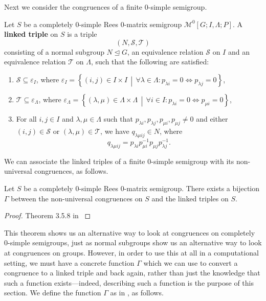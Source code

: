 Next we consider the congruences of a finite 0-simple semigroup.

\begin{definition}
  \label{def:linked-triple}
  Let $S$ be a completely 0-simple Rees 0-matrix semigroup
  $\mathcal{M}^0[G;I,\Lambda;P]$.  A \textbf{linked triple} on $S$ is a
  triple $$(N,\mathcal{S},\mathcal{T})$$ consisting of a normal subgroup
  $N \trianglelefteq G$, an equivalence relation $\mathcal{S}$ on $I$ and an
  equivalence relation $\mathcal{T}$ on $\Lambda$, such that the following are
  satisfied:
  \begin{enumerate}
  \item $\mathcal{S} \subseteq \varepsilon_I$, where $\varepsilon_I =
    \left\{(i,j) \in I \times I\, \middle|\, \forall \lambda \in \Lambda:
      p_{\lambda i}=0 \iff p_{\lambda j}=0 \right\}$,
  \item $\mathcal{T} \subseteq \varepsilon_\Lambda$, where $\varepsilon_\Lambda
    = \left\{(\lambda,\mu) \in \Lambda \times \Lambda\, \middle|\, \forall i \in
      I: p_{\lambda i}=0 \iff p_{\mu i}=0 \right\}$,
  \item For all $i,j \in I$ and $\lambda, \mu \in \Lambda$ such that
    $p_{\lambda i}, p_{\lambda j}, p_{\mu i}, p_{\mu j} \neq 0$ and either
    $(i,j) \in \mathcal{S}$ or $(\lambda,\mu) \in \mathcal{T}$, we have
    $q_{\lambda \mu i j} \in N$, where
    $$q_{\lambda \mu i j} = p_{\lambda i} p_{\mu i}^{-1} p_{\mu j} p_{\lambda
      j}^{-1}.$$
  \end{enumerate}
  \cite[\S 3.5]{howie}
\end{definition}

We can associate the linked triples of a finite 0-simple semigroup with its
non-universal congruences, as follows.

\begin{theorem}
  \label{thm:linked-triple}
  Let $S$ be a completely 0-simple Rees 0-matrix semigroup.  There exists a
  bijection $\Gamma$ between the non-universal congruences on $S$ and the linked
  triples on $S$.
  \begin{proof}
    Theorem 3.5.8 in \cite{howie}
  \end{proof}
\end{theorem}

This theorem shows us an alternative way to look at congruences on completely
0-simple semigroups, just as normal subgroups show us an alternative way to look
at congruences on groups.  However, in order to use this at all in a
computational setting, we must have a concrete function $\Gamma$ which we can
use to convert a congruence to a linked triple and back again, rather than just
the knowledge that such a function exists---indeed, describing such a function
is the purpose of this section.  We define the function $\Gamma$ as in \cite[\S
3.5]{howie}, as follows.

